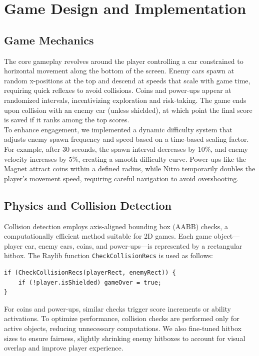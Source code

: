 \documentclass[12pt,a4paper]{article}
\begin{document}
\section{Game Design and Implementation}

\subsection{Game Mechanics}

The core gameplay revolves around the player controlling a car constrained to horizontal movement along the bottom of the screen. Enemy cars spawn at random x-positions at the top and descend at speeds that scale with game time, requiring quick reflexes to avoid collisions. Coins and power-ups appear at randomized intervals, incentivizing exploration and risk-taking. The game ends upon collision with an enemy car (unless shielded), at which point the final score is saved if it ranks among the top scores. \\

To enhance engagement, we implemented a dynamic difficulty system that adjusts enemy spawn frequency and speed based on a time-based scaling factor. For example, after 30 seconds, the spawn interval decreases by 10\%, and enemy velocity increases by 5\%, creating a smooth difficulty curve. Power-ups like the Magnet attract coins within a defined radius, while Nitro temporarily doubles the player’s movement speed, requiring careful navigation to avoid overshooting. \\

\subsection{Physics and Collision Detection}

Collision detection employs axis-aligned bounding box (AABB) checks, a computationally efficient method suitable for 2D games. Each game object—player car, enemy cars, coins, and power-ups—is represented by a rectangular hitbox. The Raylib function \texttt{CheckCollisionRecs} is used as follows: \\

\begin{verbatim}
if (CheckCollisionRecs(playerRect, enemyRect)) {
    if (!player.isShielded) gameOver = true;
}
\end{verbatim}

For coins and power-ups, similar checks trigger score increments or ability activations. To optimize performance, collision checks are performed only for active objects, reducing unnecessary computations. We also fine-tuned hitbox sizes to ensure fairness, slightly shrinking enemy hitboxes to account for visual overlap and improve player experience. \\
\end{document}
